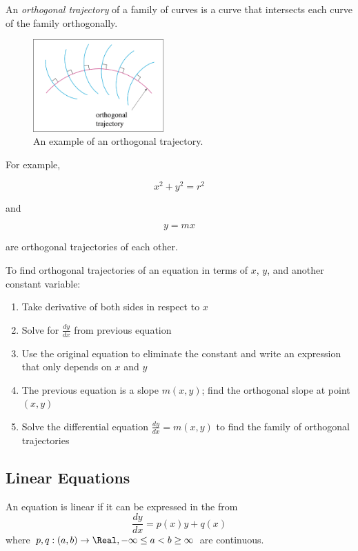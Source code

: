 An \textit{orthogonal trajectory} of a family of curves is a curve that intersects each curve of the family orthogonally.

\begin{figure}[H]
    \centering
    \includegraphics[width=50mm]{content/diffeq/images/orthogonal_0.png}
    \caption{An example of an orthogonal trajectory.}
\end{figure}

For example,

\[
    x^2 + y^2 = r^2
\]

and

\[
    y = mx
\]

are orthogonal trajectories of each other.

To find orthogonal trajectories of an equation in terms of $x$, $y$, and another constant variable:

\begin{enumerate}
    \item Take derivative of both sides in respect to $x$
    \item Solve for $\frac{dy}{dx}$ from previous equation
    \item Use the original equation to eliminate the constant and write an expression that only depends on $x$ and $y$
    \item The previous equation is a slope $m(x,y)$; find the orthogonal slope at point $(x,y)$
    \item Solve the differential equation $\frac{dy}{dx} = m(x,y)$ to find the family of orthogonal trajectories
\end{enumerate}

\subsection{Linear Equations}

\begin{definition}
    An equation is linear if it can be expressed in the from
    \[
        \frac{dy}{dx} = p(x)y + q(x)
    \]
    where $p,q : (a,b) \rightarrow \Real, -\infty \le a < b \ge \infty$ are continuous.
\end{definition}

